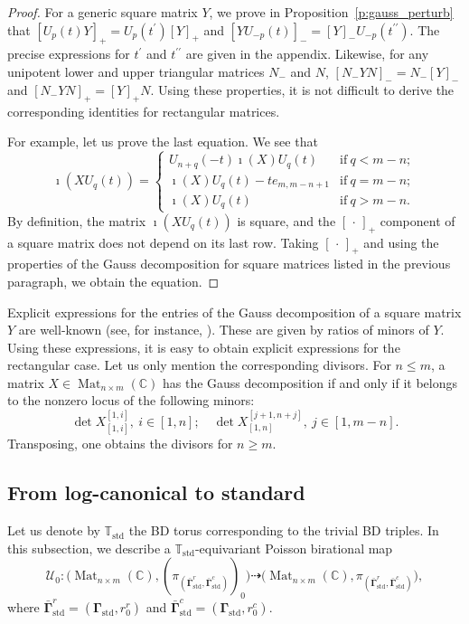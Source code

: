 \documentclass[11pt]{article}
\newcommand{\bbg}{\bar{\mathbf{\Gamma}}}
\newcommand{\bg}{\mathbf{\Gamma}}
\newcommand{\std}{\mathrm{std}}
\DeclareMathOperator{\Mat}{Mat}
\theoremstyle{definition}\newtheorem{definition}[theorem]{Definition}
\theoremstyle{definition}\newtheorem{remark}[theorem]{Remark}
\theoremstyle{remark}
\numberwithin{equation}{section}
\begin{document}
\begin{proof}
    For a generic square matrix $Y$, we prove in Proposition~\ref{p:gauss_perturb} that $[U_p(t)Y]_+ = U_p(t^\prime)[Y]_+$ and $[YU_{-p}(t)]_- = [Y]_-U_{-p}(t^{\prime\prime})$. The precise expressions for $t^\prime$ and $t^{\prime\prime}$ are given in the appendix. Likewise, for any unipotent lower and upper triangular matrices $N_-$ and $N$, $[N_-YN]_- = N_-[Y]_-$ and $[N_-YN]_+ = [Y]_+ N$. Using these properties, it is not difficult to derive the corresponding identities for rectangular matrices.
    
    For example, let us prove the last equation. We see that
    \begin{equation*}
        \imath(XU_q(t)) = \begin{cases}
                U_{n+q}(-t)\imath(X) U_q(t) & \text{if} \ q < m-n;\\
                \imath(X) U_q(t) - te_{m,m-n+1} & \text{if} \ q = m-n;\\
                 \imath(X)U_q(t) & \text{if} \ q > m-n.
            \end{cases}
    \end{equation*}
    By definition, the matrix $\imath(XU_q(t))$ is square, and the $[\, \cdot\,]_+$ component of a square matrix does not depend on its last row. Taking $[\,\cdot\,]_+$ and using the properties of the Gauss decomposition for square matrices listed in the previous paragraph, we obtain the equation.
\end{proof}

Explicit expressions for the entries of the Gauss decomposition of a square matrix $Y$ are well-known (see, for instance, \cite{gantmacher}). These are given by ratios of minors of $Y$. Using these expressions, it is easy to obtain explicit expressions for the rectangular case. Let us only mention the corresponding divisors. For $n \leq m$, a matrix $X \in \Mat_{n\times m}(\mathbb{C})$ has the Gauss decomposition if and only if it belongs to the nonzero locus of the following minors:
\begin{equation*}
    \det X_{[1,i]}^{[1,i]},\ i \in [1,n]; \quad \det X_{[1,n]}^{[j+1,n+j]}, \ j \in [1,m-n].
\end{equation*}
Transposing, one obtains the divisors for $n \geq m$. 

\subsection{From log-canonical to standard}\label{s:biratstd}
Let us denote by $\mathbb{T}_{\std}$ the BD torus corresponding to the trivial BD triples. In this subsection, we describe a $\mathbb{T}_{\std}$-equivariant Poisson birational map
\begin{equation}\label{eq:U0std}
    \mathcal{U}_0 : \big(\Mat_{n\times m}(\mathbb{C}),(\pi_{(\bbg^r_{\std},\bbg^c_{\std})})_0 \big)\dashrightarrow \big(\Mat_{n\times m}(\mathbb{C}),\pi_{(\bbg^r_{\std},\bbg^c_{\std})}\big),
\end{equation}
where $\bbg^r_{\std} = (\bg_{\std},r_0^r)$ and $\bbg^c_{\std} = (\bg_{\std},r_0^c)$.
\end{document}
